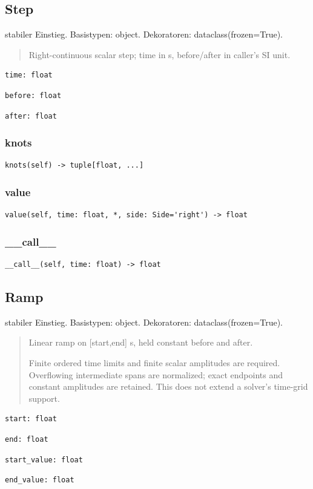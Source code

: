 \subsection{Step}
stabiler Einstieg.
Basistypen: object. Dekoratoren: dataclass(frozen=True).
\begin{quote}
Right-continuous scalar step; time in s, before/after in caller's SI unit.
\end{quote}
\begin{lstlisting}
time: float
\end{lstlisting}
\begin{lstlisting}
before: float
\end{lstlisting}
\begin{lstlisting}
after: float
\end{lstlisting}
\subsubsection*{knots}
\begin{lstlisting}
knots(self) -> tuple[float, ...]
\end{lstlisting}
\subsubsection*{value}
\begin{lstlisting}
value(self, time: float, *, side: Side='right') -> float
\end{lstlisting}
\subsubsection*{\_\_call\_\_}
\begin{lstlisting}
__call__(self, time: float) -> float
\end{lstlisting}
\subsection{Ramp}
stabiler Einstieg.
Basistypen: object. Dekoratoren: dataclass(frozen=True).
\begin{quote}
Linear ramp on [start,end] s, held constant before and after.\par Finite ordered time limits and finite scalar amplitudes are required. Overflowing intermediate spans are normalized; exact endpoints and constant amplitudes are retained. This does not extend a solver's time-grid support.
\end{quote}
\begin{lstlisting}
start: float
\end{lstlisting}
\begin{lstlisting}
end: float
\end{lstlisting}
\begin{lstlisting}
start_value: float
\end{lstlisting}
\begin{lstlisting}
end_value: float
\end{lstlisting}

